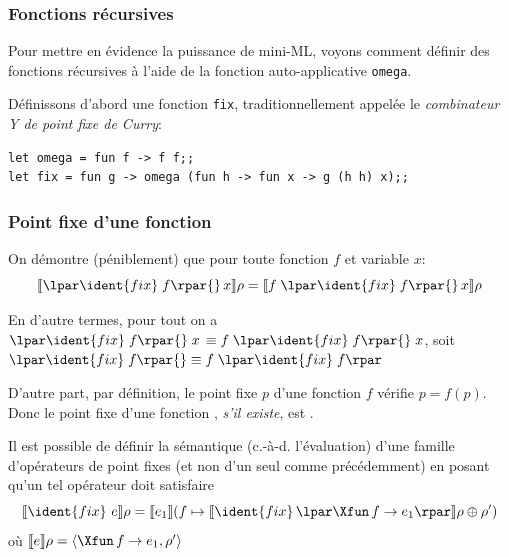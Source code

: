 %
\begin{frame}[containsverbatim]
\frametitle{Fonctions récursives}

Pour mettre en évidence la puissance de mini-ML, voyons comment
définir des fonctions récursives à l'aide de la fonction
auto-applicative \texttt{\small omega}.

\bigskip

Définissons d'abord une fonction \texttt{\small fix},
traditionnellement appelée le \emph{combinateur Y de point fixe de
Curry}:
\begin{verbatim}
let omega = fun f -> f f;;
let fix = fun g -> omega (fun h -> fun x -> g (h h) x);;
\end{verbatim}

\end{frame}

%
\begin{frame}
\frametitle{Point fixe d'une fonction}

On démontre (péniblement) que pour toute fonction $f$ et variable $x$:
$$\evalf{\lpar\ident{fix} \; f\rpar{} \, x}{\rho} = \evalf{f \;
  \lpar\ident{fix} \; f\rpar{} \, x}{\rho}$$

En d'autre termes, pour tout  on a $\lpar\ident{fix} \; f\rpar{}
\; x \, \equiv f \; \lpar\ident{fix} \; f\rpar{} \; x$, soit
$\lpar\ident{fix} \; f\rpar{} \equiv f \; \lpar\ident{fix} \; f\rpar$

\bigskip

D'autre part, par définition, le point fixe $p$ d'une fonction $f$
vérifie $p = f(p)$. Donc le point fixe d'une fonction ,
\emph{s'il existe}, est \lpar{} \rpar{}.

\bigskip

Il est possible de définir la sémantique (c.-à-d. l'évaluation) d'une
famille d'opérateurs de point fixes (et non d'un seul comme
précédemment) en posant qu'un tel opérateur doit satisfaire
$$\evalf{\ident{fix} \,\, e}{\rho} = \evalf{e_1}{(f \mapsto
  \evalf{\ident{fix} \, \lpar\Xfun \, f \rightarrow e_1\rpar}{\rho}
  \oplus \rho')}$$ où $\evalf{e}{\rho} = \langle\Xfun \, f \rightarrow
e_1,\rho'\rangle$

\end{frame}

